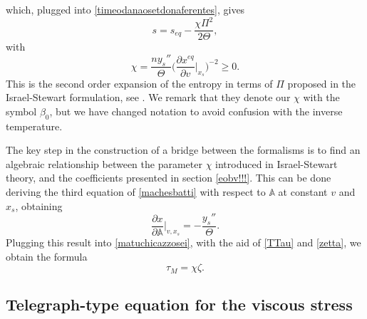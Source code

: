 \documentclass[useAMS,usenatbib,prd,twocolumn,nofootinbib]{revtex4-1}
\begin{document}
which, plugged into \eqref{timeodanaosetdonaferentes}, gives
\begin{equation}
s = s_{eq} - \dfrac{\chi \Pi^2}{2 \Theta},
\end{equation}
with
\begin{equation}\label{matuchicazzosei}
\chi = \dfrac{n y_s''}{\Theta} 
\bigg( \dfrac{\partial x^{eq}}{\partial v} \bigg|_{x_s} \bigg)^{-2} \geq 0 .
\end{equation}
This is the second order expansion of the entropy in terms of $\Pi$ proposed in the Israel-Stewart formulation, see \cite{andersson2007review}. We remark that they denote our $\chi$ with the symbol $\beta_0$, but we have changed notation to avoid confusion with the inverse temperature.

The key step in the construction of a bridge between the formalisms is to find an algebraic relationship between the parameter $\chi$ introduced in Israel-Stewart theory, and the coefficients presented in section \ref{eobv!!!}. This can be done deriving the third equation of \eqref{machesbatti} with respect to $\mathbb{A}$ at constant $v$ and $x_s$, obtaining
\begin{equation}\label{krabnebula}
\dfrac{\partial x}{\partial \mathbb{A}} \bigg|_{v,x_s} = - \dfrac{y_s''}{\Theta}.
\end{equation}
Plugging this result into \eqref{matuchicazzosei}, with the aid of \eqref{TTau} and \eqref{zetta}, we obtain the formula
\begin{equation}\label{chichichcichci}
\tau_M = \chi \zeta .
\end{equation}



\subsection{Telegraph-type equation for the viscous stress}
 
\end{document}
